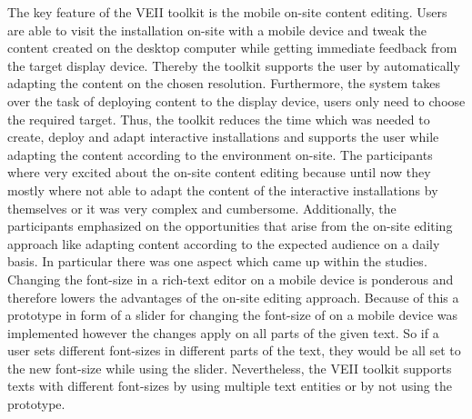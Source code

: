The key feature of the VEII toolkit is the mobile on-site content editing. Users are able to visit the installation on-site with a mobile device and tweak the content created on the desktop computer while getting immediate feedback from the target display device. Thereby the toolkit supports the user by automatically adapting the content on the chosen resolution. Furthermore, the system takes over the task of deploying content to the display device, users only need to choose the required target. Thus, the toolkit reduces the time which was needed to create, deploy and adapt interactive installations and supports the user while adapting the content according to the environment on-site. The participants where very excited about the on-site content editing because until now they mostly where not able to adapt the content of the interactive installations by themselves or it was very complex and cumbersome. Additionally, the participants emphasized on the opportunities that arise from the on-site editing approach like adapting content according to the expected audience on a daily basis. In particular there was one aspect which came up within the studies. Changing the font-size in a rich-text editor on a mobile device is ponderous and therefore lowers the advantages of the on-site editing approach. Because of this a prototype in form of a slider for changing the font-size of on a mobile device was implemented however the changes apply on all parts of the given text. So if a user sets different font-sizes in different parts of the text, they would be all set to the new font-size while using the slider. Nevertheless, the VEII toolkit supports texts with different font-sizes by using multiple text entities or by not using the prototype. 
